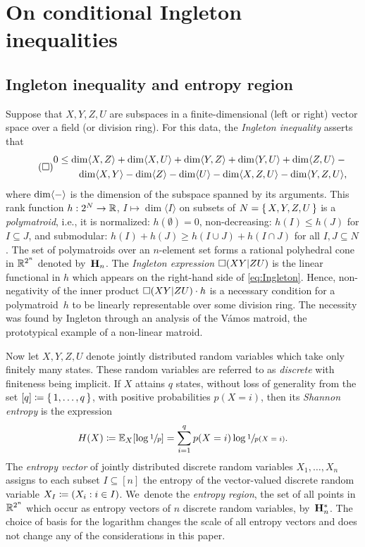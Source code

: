 \documentclass[11pt, a4paper]{tboege-preprint}
\newcommand{\Span}[1]{\langle#1\rangle}
\begin{document}
\section{On conditional Ingleton inequalities}
\label{sec:Ingleton}

\subsection{Ingleton inequality and entropy region}
\label{sec:Entropy}

Suppose that $X,Y,Z,U$ are subspaces in a finite-dimensional (left
or right) vector space over a field (or division ring). For this data,
the \emph{Ingleton inequality} asserts that
\begin{equation}
  \label{eq:Ingleton}
  \tag{$\CIbOp$}
  \begin{aligned}
  0 &\le \dim\Span{X,Z} + \dim\Span{X,U} + \dim\Span{Y,Z} + \dim\Span{Y,U} + \dim\Span{Z,U} - {} \\
    &\hphantom{{}\!\le{}} \hphantom{-} \dim\Span{X,Y} - \dim\Span{Z} - \dim\Span{U} - \dim\Span{X,Z,U} - \dim\Span{Y,Z,U},
  \end{aligned}
\end{equation}
where $\dim\Span{\blank}$ is the dimension of the subspace spanned
by its arguments. This rank function $h: 2^N \to \mathbb{R}$,
$I \mapsto \dim\Span{I}$ on subsets of $N = \left\{\,X,Y,Z,U\,\right\}$ is a
\emph{polymatroid}, i.e., it is normalized: $h(\emptyset) = 0$,
non-decreasing: $h(I) \le h(J)$ for $I \subseteq J$, and submodular:
$h(I) + h(J) \ge h(I \cup J) + h(I \cap J)$ for all $I, J \subseteq N$.
The set of polymatroids over an $n$-element set forms a rational
polyhedral cone in $\mathbb{R}^{2^n}$ denoted by~$\mathbf{H}_n$.
%
The \emph{Ingleton expression} $\CIb{XY|ZU}$ is the linear functional
in $h$ which appears on the right-hand side of \eqref{eq:Ingleton}.
Hence, non-negativity of the inner product $\CIb{XY|ZU} \cdot h$ is
a necessary condition for a polymatroid~$h$ to be linearly representable
over some division ring.
The necessity was found by Ingleton \cite{Ingleton} through an analysis
of the Vámos matroid, the prototypical example of a non-linear matroid.

Now let $X,Y,Z,U$ denote jointly distributed random variables which
take only finitely many states. These random variables are referred
to as \emph{discrete} with finiteness being implicit. If $X$ attains
$q$ states, without loss of generality from the set $[q] \coloneqq
\left\{\,1, \dots, q\,\right\}$, with positive probabilities $p(X=i)$, then its
\emph{Shannon entropy} is the expression
\[
  H(X) \coloneqq \mathbb{E}_X[\log\sfrac1{p}] = \sum_{i=1}^q p(X=i) \log \sfrac1{p(X=i)}.
\]
The \emph{entropy vector} of jointly distributed discrete random variables
$X_1, \dots, X_n$ assigns to each subset $I \subseteq [n]$ the entropy of
the vector-valued discrete random variable $X_I \coloneqq (X_i : i \in I)$.
We~denote the \emph{entropy region}, the set of all points in $\mathbb{R}^{2^n}$
which occur as entropy vectors of $n$ discrete random variables, by~$\mathbf{H}_n^*$.
The choice of basis for the logarithm changes the scale of all entropy vectors
and does not change any of the considerations in this paper.
\end{document}
